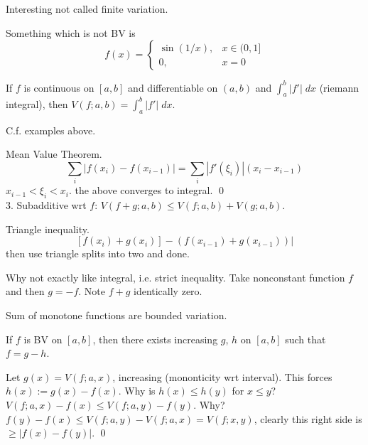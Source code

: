 Interesting not called finite variation. 


Something which is not BV is 
	\[
	f(x)=
	\begin{cases}
	\sin(1/x), & x \in (0,1] \\
	0, & x=0
	\end{cases}
	\]



\begin{thm}
If $f$ is continuous on $[a,b]$ and differentiable on $(a,b)$ and $\int_a^b |f'| \; dx$ (riemann integral), then $V(f;a,b)= \int_a^b |f'| \; dx$.
\end{thm}

C.f. examples above. 


\pf Mean Value Theorem. 
	\[
	\sum_i |f(x_i) - f(x_{i-1})| = \sum_i |f'(\xi_i)| (x_i-x_{i-1})
	\]
$x_{i-1}< \xi_i < x_i$. the above converges to integral. \qed \\

3. Subadditive wrt $f$:
$V(f+g; a,b) \leq V(f; a,b) + V(g; a,b)$. 

\pf Triangle inequality.
	\[
	[f(x_i) + g(x_i)] - (f(x_{i-1}) + g(x_{i-1})) |
	\]
then use triangle splits into two and done. 

Why not exactly like integral, i.e. strict inequality. Take nonconstant function $f$ and then $g= -f$. Note $f+g$ identically zero. 




Sum of monotone functions are bounded variation. 



\begin{thm}[BV Decomposition]
If $f$ is BV on $[a,b]$, then there exists increasing $g$, $h$ on $[a,b]$ such that $f= g-h$. 
\end{thm}

\pf Let $g(x)= V(f; a,x)$, increasing (mononticity wrt interval). This forces $h(x):= g(x) - f(x)$. Why is $h(x) \leq h(y)$ for $x \leq y$? $V(f;a,x) - f(x) \leq V(f; a,y) - f(y)$. Why? $f(y)-f(x) \leq V(f; a,y) - V(f; a,x)= V(f;x,y)$, clearly this right side is $ \geq |f(x)-f(y)|$. \qed \\









